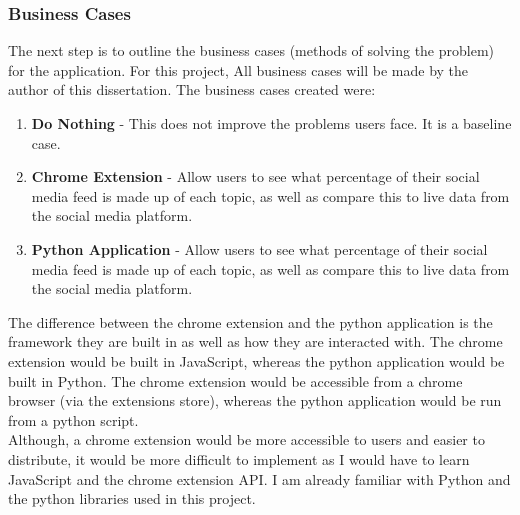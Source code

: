 \subsubsection{Business Cases}
The next step is to outline the business cases (methods of solving the problem) for the application. For this project,
All business cases will be made by the author of this dissertation. The business cases created were:
\begin{enumerate}
    \item \textbf{Do Nothing} - This does not improve the problems users face. It is a baseline case.
    \item \textbf{Chrome Extension} - Allow users to see what percentage of their social media feed is made up of each topic, as well as compare this to live data from the social media platform.
    \item \textbf{Python Application} - Allow users to see what percentage of their social media feed is made up of each topic, as well as compare this to live data from the social media platform.
\end{enumerate}

The difference between the chrome extension and the python application is the framework they are built in as well as how
they are interacted with. The chrome extension would be built in JavaScript, whereas the python application would be built in Python.
The chrome extension would be accessible from a chrome browser (via the extensions store), whereas the python application would be
run from a python script.\\
Although, a chrome extension would be more accessible to users and easier to distribute, it would be more difficult to implement
as I would have to learn JavaScript and the chrome extension API. I am already familiar with Python and the python libraries used
in this project.
